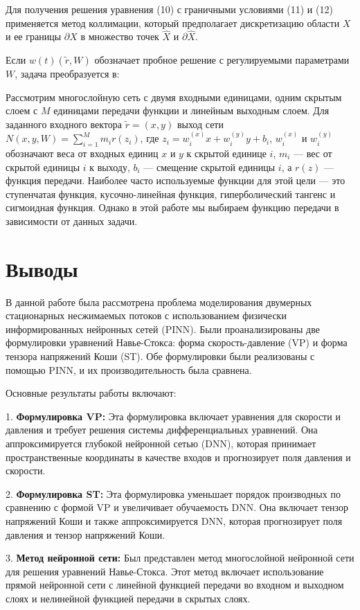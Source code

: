 \documentclass[a4paper,12pt]{article}
\theoremstyle{plain} %
\theoremstyle{definition} %
\theoremstyle{remark} %
\begin{document}
Для получения решения уравнения (10) с граничными условиями (11) и (12) применяется метод коллимации, который предполагает дискретизацию области $X$ и ее границы $\partial X$ в множество точек $\hat{X}$ и $\partial \hat{X}$.

Если $w(t)(\tilde{r}, W)$ обозначает пробное решение с регулируемыми параметрами $W$, задача преобразуется в:

Рассмотрим многослойную сеть с двумя входными единицами, одним скрытым слоем с $M$ единицами передачи функции и линейным выходным слоем. Для заданного входного вектора $\tilde{r} = (x, y)$ выход сети $N(x, y, W) = \sum_{i=1}^{M} m_i r(z_i)$, где $z_i = w_i^{(x)} x + w_i^{(y)} y + b_i$, $w_i^{(x)}$ и $w_i^{(y)}$ обозначают веса от входных единиц $x$ и $y$ к скрытой единице $i$, $m_i$ — вес от скрытой единицы $i$ к выходу, $b_i$ — смещение скрытой единицы $i$, а $r(z)$ — функция передачи. Наиболее часто используемые функции для этой цели — это ступенчатая функция, кусочно-линейная функция, гиперболический тангенс и сигмоидная функция. Однако в этой работе мы выбираем функцию передачи в зависимости от данных задачи.
 

\section{Выводы}

В данной работе была рассмотрена проблема моделирования двумерных стационарных несжимаемых потоков с использованием физически информированных нейронных сетей (PINN). Были проанализированы две формулировки уравнений Навье-Стокса: форма скорость-давление (VP) и форма тензора напряжений Коши (ST). Обе формулировки были реализованы с помощью PINN, и их производительность была сравнена.

Основные результаты работы включают:

1. \textbf{Формулировка VP:} Эта формулировка включает уравнения для скорости и давления и требует решения системы дифференциальных уравнений. Она аппроксимируется глубокой нейронной сетью (DNN), которая принимает пространственные координаты в качестве входов и прогнозирует поля давления и скорости.

2. \textbf{Формулировка ST:} Эта формулировка уменьшает порядок производных по сравнению с формой VP и увеличивает обучаемость DNN. Она включает тензор напряжений Коши и также аппроксимируется DNN, которая прогнозирует поля давления и тензор напряжений Коши.

3. \textbf{Метод нейронной сети:} Был представлен метод многослойной нейронной сети для решения уравнений Навье-Стокса. Этот метод включает использование прямой нейронной сети с линейной функцией передачи во входном и выходном слоях и нелинейной функцией передачи в скрытых слоях.
\end{document}
